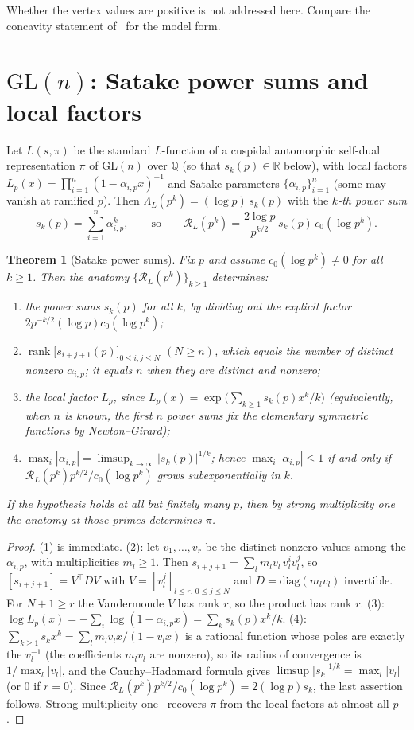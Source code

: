 \documentclass[11pt]{amsart}
\newtheorem{theorem}{Theorem}[section]
\theoremstyle{definition}
\theoremstyle{remark}
\newcommand{\cR}{\mathcal R}
\newcommand{\GL}{\mathrm{GL}}
\DeclareMathOperator{\rank}{rank}
\begin{document}
Whether the vertex values are positive is not addressed here. Compare the
concavity statement of~\cite{RP9} for the model form.

\section{\texorpdfstring{$\GL(n)$: Satake power sums and local factors}{GL(n): Satake power sums and local factors}}\label{sec:gln}
Let $L(s,\pi)$ be the standard $L$-function of a cuspidal automorphic
self-dual representation $\pi$ of $\GL(n)$ over $\mathbb Q$ (so that
$s_k(p)\in\mathbb R$ below), with local factors
$L_p(x)=\prod_{i=1}^n(1-\alpha_{i,p}x)^{-1}$ and Satake parameters
$\{\alpha_{i,p}\}_{i=1}^n$ (some may vanish at ramified $p$). Then
$\Lambda_L(p^k)=(\log p)\,s_k(p)$ with the \emph{$k$-th power sum}
\[
s_k(p)=\sum_{i=1}^n\alpha_{i,p}^k,\qquad\text{so}\qquad
\cR_L(p^k)=\frac{2\log p}{p^{k/2}}\,s_k(p)\,c_0(\log p^k).
\]

\begin{theorem}[Satake power sums]\label{thm:satake}
Fix $p$ and assume $c_0(\log p^k)\ne0$ for all $k\ge1$. Then the anatomy
$\{\cR_L(p^k)\}_{k\ge1}$ determines:
\begin{enumerate}
\item the power sums $s_k(p)$ for all $k$, by dividing out the explicit factor
$2p^{-k/2}(\log p)c_0(\log p^k)$;
\item $\rank\bigl[s_{i+j+1}(p)\bigr]_{0\le i,j\le N}$ $(N\ge n)$, which equals the
number of distinct nonzero $\alpha_{i,p}$; it equals $n$ when they are distinct
and nonzero;
\item the local factor $L_p$, since $L_p(x)=\exp\bigl(\sum_{k\ge1}s_k(p)x^k/k\bigr)$
(equivalently, when $n$ is known, the first $n$ power sums fix the elementary
symmetric functions by Newton--Girard);
\item $\max_i|\alpha_{i,p}|=\limsup_{k\to\infty}|s_k(p)|^{1/k}$; hence
$\max_i|\alpha_{i,p}|\le1$ if and only if
$\cR_L(p^k)p^{k/2}/c_0(\log p^k)$ grows subexponentially in $k$.
\end{enumerate}
If the hypothesis holds at all but finitely many $p$, then by strong
multiplicity one the anatomy at those primes determines $\pi$.
\end{theorem}
\begin{proof}
(1) is immediate. (2): let $v_1,\dots,v_r$ be the distinct nonzero values among
the $\alpha_{i,p}$, with multiplicities $m_l\ge1$. Then
$s_{i+j+1}=\sum_lm_lv_l\,v_l^{i}v_l^{j}$, so
$[s_{i+j+1}]=V^{\top}DV$ with $V=[v_l^{j}]_{l\le r,\,0\le j\le N}$ and
$D=\mathrm{diag}(m_lv_l)$ invertible. For $N+1\ge r$ the Vandermonde $V$ has rank
$r$, so the product has rank $r$. (3): $\log L_p(x)=-\sum_i\log(1-\alpha_{i,p}x)
=\sum_ks_k(p)x^k/k$. (4): $\sum_{k\ge1}s_kx^k=\sum_lm_lv_lx/(1-v_lx)$ is a rational
function whose poles are exactly the $v_l^{-1}$ (the coefficients $m_lv_l$ are
nonzero), so its radius of convergence is $1/\max_l|v_l|$, and the
Cauchy--Hadamard formula gives $\limsup|s_k|^{1/k}=\max_l|v_l|$ (or $0$ if
$r=0$). Since $\cR_L(p^k)p^{k/2}/c_0(\log p^k)=2(\log p)s_k$, the last assertion
follows. Strong multiplicity one~\cite{JS} recovers $\pi$ from the local factors
at almost all $p$.
\end{proof}
\end{document}
